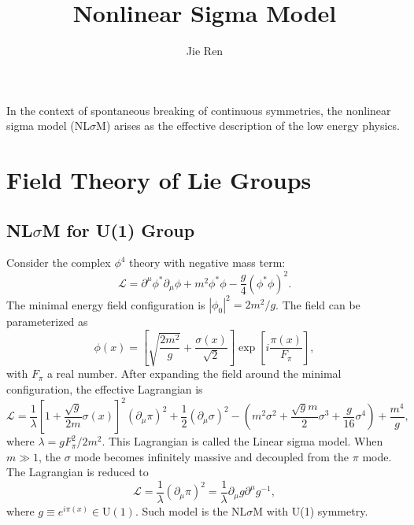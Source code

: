 \documentclass[aps,prb,superscriptaddress,nofootinbib]{revtex4}
\begin{document}
\title{Nonlinear Sigma Model}
\author{Jie Ren}


\maketitle

In the context of spontaneous breaking of continuous symmetries, the nonlinear sigma model (NL$\sigma$M) arises as the effective description of the low energy physics.

\tableofcontents

\section{Field Theory of Lie Groups}

\subsection{NL$\sigma$M for U(1) Group}
Consider the complex $\phi^4$ theory with negative mass term:
\begin{equation}
	\mathcal L = \partial^\mu \phi^* \partial_\mu \phi + m^2\phi^* \phi - \frac{g}{4}(\phi^*\phi)^2.
\end{equation}
The minimal energy field configuration is $|\phi_0|^2 = 2m^2/g$.
The field can be parameterized as
\begin{equation}
	\phi(x)=\left[\sqrt{\frac{2 m^{2}}{g}}+\frac{\sigma(x)}{\sqrt{2}} \right] \exp\left[{i \frac{\pi(x)}{F_{\pi}}}\right],
\end{equation}
with $F_{\pi}$ a real number.
After expanding the field around the minimal configuration, the effective Lagrangian is
\begin{equation}
	\mathcal{L}= \frac{1}{\lambda} \left[1+\frac{\sqrt{g}}{2m} \sigma(x) \right]^{2} \left(\partial_{\mu} \pi\right)^{2} +\frac{1}{2}\left(\partial_{\mu} \sigma\right)^{2}
	-\left(m^{2} \sigma^{2}+\frac{\sqrt{g} m}{2} \sigma^{3}+\frac{g}{16} \sigma^{4}\right)+\frac{m^{4}}{g},
\end{equation}
where $\lambda = gF_\pi^2/2m^2$.
This Lagrangian is called the Linear sigma model.
When $m\gg 1$, the $\sigma$ mode becomes infinitely massive and decoupled from the $\pi$ mode.
The Lagrangian is reduced to
\begin{equation}
	\mathcal L = \frac{1}{\lambda} (\partial_\mu \pi)^2 = \frac{1}{\lambda}\partial_\mu g \partial^\mu g^{-1},
\end{equation}
where $g \equiv e^{i\pi(x)} \in \mathrm{U}(1)$. 
Such model is the NL$\sigma$M with U(1) symmetry.
\end{document}
